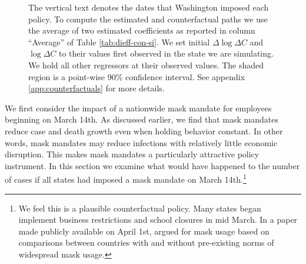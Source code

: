 \documentclass[3p, longtitle]{elsarticle}
\theoremstyle{definition}
\begin{document}
\begin{figure}[ht]
\begin{minipage}{\linewidth}
    \begin{flushleft}
      \footnotesize The vertical text denotes the dates that
      Washington imposed each policy.  To compute the estimated and
      counterfactual paths we use the average of two estimated
      coefficients as reported in column ``Average'' of Table
      \ref{tab:dieff-con-si}. We set initial $\Delta \log \Delta C$
      and $\log \Delta C$ to their values first observed in the state
      we are simulating. We hold all other regressors at their
      observed values. The shaded region is a point-wise 90\%
      confidence interval. See appendix \ref{app:counterfactuals} for
      more details.
    \end{flushleft}
  \end{minipage}
\end{figure}


We first consider the impact of a nationwide mask mandate for
employees beginning on March 14th. As discussed earlier, we find that
mask mandates reduce case and death growth even when holding behavior
constant. In other words, mask mandates may reduce infections with
relatively little economic disruption. This makes mask mandates a
particularly attractive policy instrument. In this section we examine
what would have happened to the number of cases if all states had
imposed a mask mandate on March 14th.\footnote{We feel this is a
  plausible counterfactual policy. Many states began implement
  business restrictions and school closures in mid March. In a paper
  made publicly available on April 1st, \cite{abaluck2020} argued for
  mask usage based on comparisons between countries with and without
  pre-existing norms of widespread mask usage.}
\end{document}
